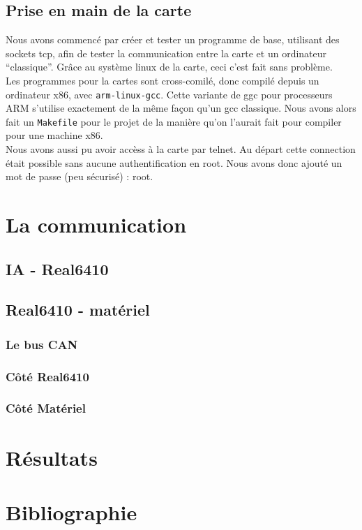 \documentclass[a4,french,12pt]{article}
\begin{document}
\subsection{Prise en main de la carte}
Nous avons commencé par créer et tester un programme de base, utilisant des sockets tcp, afin de tester la communication entre 
la carte et un ordinateur ``classique''. Grâce au système linux de la carte, ceci c'est fait sans problème. \\
Les programmes pour la cartes sont cross-comilé, donc compilé depuis un ordinateur x86, avec \texttt{arm-linux-gcc}. Cette 
variante de ggc pour processeurs ARM s'utilise exactement de la même façon qu'un gcc classique. Nous avons alors fait un 
\texttt{Makefile} pour le projet de la manière qu'on l'aurait fait pour compiler pour une machine x86. \\
Nous avons aussi pu avoir accèss à la carte par telnet. Au départ cette connection était possible sans aucune authentification 
en root. Nous avons donc ajouté un mot de passe (peu sécurisé) : root.

\newpage
\section{La communication}
\subsection{IA - Real6410}

\subsection{Real6410 - matériel}
\subsubsection{Le bus CAN}

\subsubsection{Côté Real6410}

\subsubsection{Côté Matériel}

\newpage
\section{Résultats}

\newpage
\section{Bibliographie}
\end{document}
